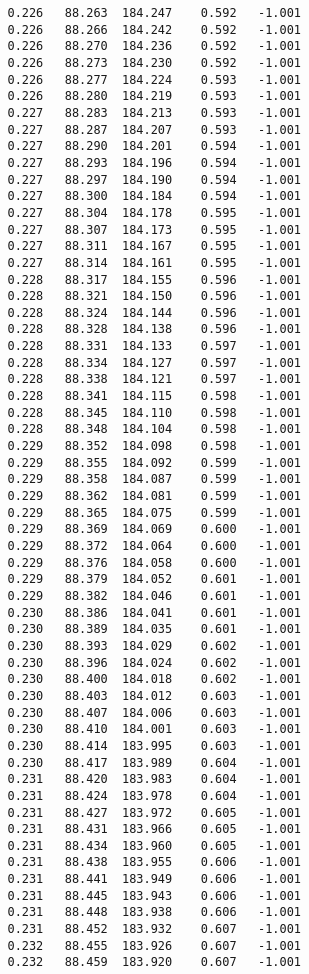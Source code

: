 \begin{verbatim}
   0.226   88.263  184.247    0.592   -1.001
   0.226   88.266  184.242    0.592   -1.001
   0.226   88.270  184.236    0.592   -1.001
   0.226   88.273  184.230    0.592   -1.001
   0.226   88.277  184.224    0.593   -1.001
   0.226   88.280  184.219    0.593   -1.001
   0.227   88.283  184.213    0.593   -1.001
   0.227   88.287  184.207    0.593   -1.001
   0.227   88.290  184.201    0.594   -1.001
   0.227   88.293  184.196    0.594   -1.001
   0.227   88.297  184.190    0.594   -1.001
   0.227   88.300  184.184    0.594   -1.001
   0.227   88.304  184.178    0.595   -1.001
   0.227   88.307  184.173    0.595   -1.001
   0.227   88.311  184.167    0.595   -1.001
   0.227   88.314  184.161    0.595   -1.001
   0.228   88.317  184.155    0.596   -1.001
   0.228   88.321  184.150    0.596   -1.001
   0.228   88.324  184.144    0.596   -1.001
   0.228   88.328  184.138    0.596   -1.001
   0.228   88.331  184.133    0.597   -1.001
   0.228   88.334  184.127    0.597   -1.001
   0.228   88.338  184.121    0.597   -1.001
   0.228   88.341  184.115    0.598   -1.001
   0.228   88.345  184.110    0.598   -1.001
   0.228   88.348  184.104    0.598   -1.001
   0.229   88.352  184.098    0.598   -1.001
   0.229   88.355  184.092    0.599   -1.001
   0.229   88.358  184.087    0.599   -1.001
   0.229   88.362  184.081    0.599   -1.001
   0.229   88.365  184.075    0.599   -1.001
   0.229   88.369  184.069    0.600   -1.001
   0.229   88.372  184.064    0.600   -1.001
   0.229   88.376  184.058    0.600   -1.001
   0.229   88.379  184.052    0.601   -1.001
   0.229   88.382  184.046    0.601   -1.001
   0.230   88.386  184.041    0.601   -1.001
   0.230   88.389  184.035    0.601   -1.001
   0.230   88.393  184.029    0.602   -1.001
   0.230   88.396  184.024    0.602   -1.001
   0.230   88.400  184.018    0.602   -1.001
   0.230   88.403  184.012    0.603   -1.001
   0.230   88.407  184.006    0.603   -1.001
   0.230   88.410  184.001    0.603   -1.001
   0.230   88.414  183.995    0.603   -1.001
   0.230   88.417  183.989    0.604   -1.001
   0.231   88.420  183.983    0.604   -1.001
   0.231   88.424  183.978    0.604   -1.001
   0.231   88.427  183.972    0.605   -1.001
   0.231   88.431  183.966    0.605   -1.001
   0.231   88.434  183.960    0.605   -1.001
   0.231   88.438  183.955    0.606   -1.001
   0.231   88.441  183.949    0.606   -1.001
   0.231   88.445  183.943    0.606   -1.001
   0.231   88.448  183.938    0.606   -1.001
   0.231   88.452  183.932    0.607   -1.001
   0.232   88.455  183.926    0.607   -1.001
   0.232   88.459  183.920    0.607   -1.001

\end{verbatim}
